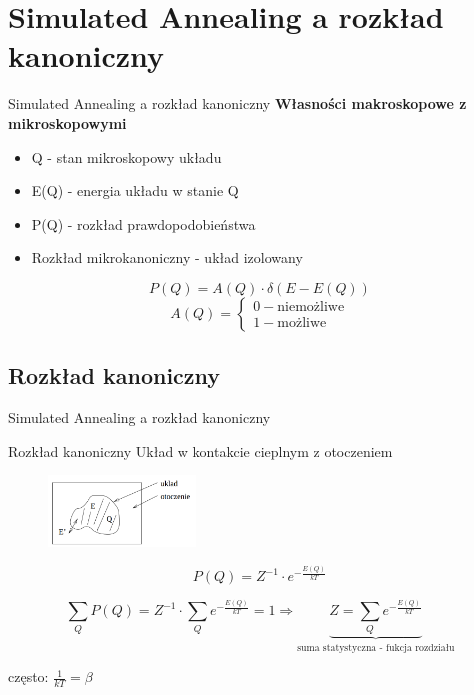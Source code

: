 \section{Simulated Annealing a rozkład kanoniczny}
	
	\begin{frame}{Simulated Annealing a rozkład kanoniczny}
		\textbf{Własności makroskopowe z mikroskopowymi}
		\begin{itemize}
			\item Q - stan mikroskopowy układu
			\item E(Q) - energia układu w stanie Q
			\item P(Q) - rozkład prawdopodobieństwa 
			\item Rozkład mikrokanoniczny - układ izolowany
		\end{itemize}
		$$
		P(Q) = A(Q) \cdot \delta(E - E(Q))
		$$
		$$
		A(Q) = \begin{cases}
		0 - \text{niemożliwe} \\
		1 - \text{możliwe}
		\end{cases}
		$$
	\end{frame}

\subsection{Rozkład kanoniczny}

	\begin{frame}{Simulated Annealing a rozkład kanoniczny}
		\begin{block}{Rozkład kanoniczny}
			Układ w kontakcie cieplnym z otoczeniem
		\end{block}
		
		\begin{figure}
			\includegraphics[width=0.35\textwidth]{img/18/canonical_distribution}
		\end{figure}
		
		$$
		P(Q) = Z^{-1} \cdot e^{-\frac{E(Q)}{kT}}
		$$
		
		$$
		\sum_Q P(Q) = Z^{-1} \cdot \sum_Q e^{-\frac{E(Q)}{kT}} = 1 \Rightarrow \underbrace{Z = \sum_Q e^{-\frac{E(Q)}{kT}}}_{\text{suma statystyczna - fukcja rozdziału}}
		$$
		
		często: $\frac{1}{kT} = \beta$
	\end{frame}

